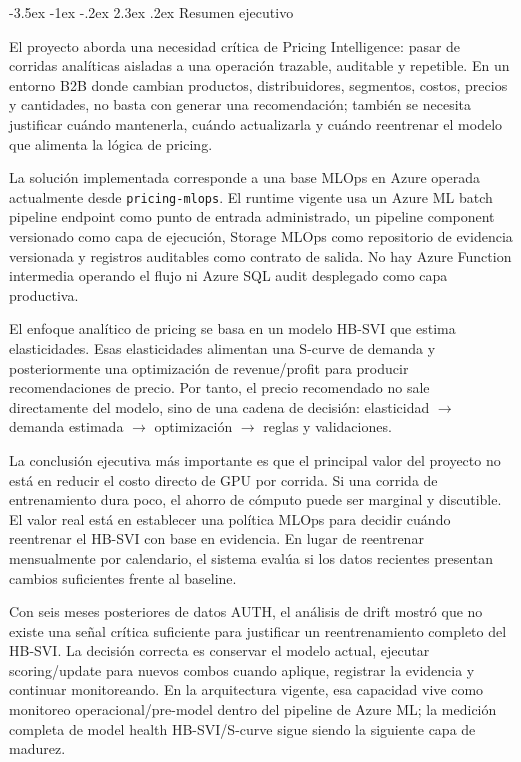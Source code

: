\documentclass[11pt,letterpaper]{article}
\makeatletter
\renewcommand\section{\@startsection{section}{1}{\z@}
  {-3.5ex \@plus -1ex \@minus -.2ex}
  {2.3ex \@plus .2ex}
  {\Large\bfseries\sffamily\color{azulTec}}}
\makeatother
\begin{document}
\section{Resumen ejecutivo}

El proyecto aborda una necesidad crítica de Pricing Intelligence: pasar de corridas analíticas aisladas a una operación trazable, auditable y repetible. En un entorno B2B donde cambian productos, distribuidores, segmentos, costos, precios y cantidades, no basta con generar una recomendación; también se necesita justificar cuándo mantenerla, cuándo actualizarla y cuándo reentrenar el modelo que alimenta la lógica de pricing.

La solución implementada corresponde a una base MLOps en Azure operada actualmente desde \texttt{pricing-mlops}. El runtime vigente usa un Azure ML batch pipeline endpoint como punto de entrada administrado, un pipeline component versionado como capa de ejecución, Storage MLOps como repositorio de evidencia versionada y registros auditables como contrato de salida. No hay Azure Function intermedia operando el flujo ni Azure SQL audit desplegado como capa productiva.

El enfoque analítico de pricing se basa en un modelo HB-SVI que estima elasticidades. Esas elasticidades alimentan una S-curve de demanda y posteriormente una optimización de revenue/profit para producir recomendaciones de precio. Por tanto, el precio recomendado no sale directamente del modelo, sino de una cadena de decisión: elasticidad $\rightarrow$ demanda estimada $\rightarrow$ optimización $\rightarrow$ reglas y validaciones.

La conclusión ejecutiva más importante es que el principal valor del proyecto no está en reducir el costo directo de GPU por corrida. Si una corrida de entrenamiento dura poco, el ahorro de cómputo puede ser marginal y discutible. El valor real está en establecer una política MLOps para decidir cuándo reentrenar el HB-SVI con base en evidencia. En lugar de reentrenar mensualmente por calendario, el sistema evalúa si los datos recientes presentan cambios suficientes frente al baseline.

Con seis meses posteriores de datos AUTH, el análisis de drift mostró que no existe una señal crítica suficiente para justificar un reentrenamiento completo del HB-SVI. La decisión correcta es conservar el modelo actual, ejecutar scoring/update para nuevos combos cuando aplique, registrar la evidencia y continuar monitoreando. En la arquitectura vigente, esa capacidad vive como monitoreo operacional/pre-model dentro del pipeline de Azure ML; la medición completa de model health HB-SVI/S-curve sigue siendo la siguiente capa de madurez.
\end{document}
